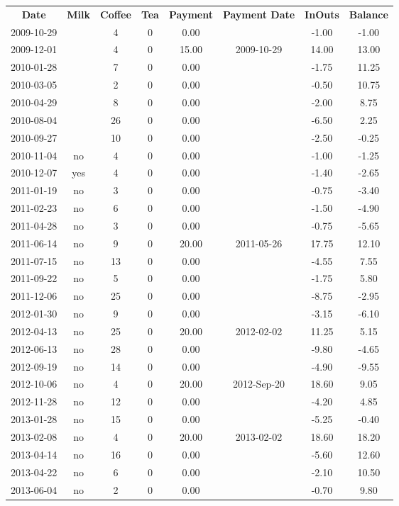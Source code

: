 \begin{center}
\begin{tabular}{cccccccc}
\textbf{Date} & \textbf{Milk} & \textbf{Coffee} & \textbf{Tea} & \textbf{Payment} & \textbf{Payment Date} & \textbf{InOuts} & \textbf{Balance} \\
2009-10-29 &  &  4 & 0 &  0.00 &  & -1.00 & -1.00\\ 
2009-12-01 &  &  4 & 0 & 15.00 & 2009-10-29 & 14.00 & 13.00\\ 
2010-01-28 &  &  7 & 0 &  0.00 &  & -1.75 & 11.25\\ 
2010-03-05 &  &  2 & 0 &  0.00 &  & -0.50 & 10.75\\ 
2010-04-29 &  &  8 & 0 &  0.00 &  & -2.00 &  8.75\\ 
2010-08-04 &  & 26 & 0 &  0.00 &  & -6.50 &  2.25\\ 
2010-09-27 &  & 10 & 0 &  0.00 &  & -2.50 & -0.25\\ 
2010-11-04 & no &  4 & 0 &  0.00 &  & -1.00 & -1.25\\ 
2010-12-07 & yes &  4 & 0 &  0.00 &  & -1.40 & -2.65\\ 
2011-01-19 & no &  3 & 0 &  0.00 &  & -0.75 & -3.40\\ 
2011-02-23 & no &  6 & 0 &  0.00 &  & -1.50 & -4.90\\ 
2011-04-28 & no &  3 & 0 &  0.00 &  & -0.75 & -5.65\\ 
2011-06-14 & no &  9 & 0 & 20.00 & 2011-05-26 & 17.75 & 12.10\\ 
2011-07-15 & no & 13 & 0 &  0.00 &  & -4.55 &  7.55\\ 
2011-09-22 & no &  5 & 0 &  0.00 &  & -1.75 &  5.80\\ 
2011-12-06 & no & 25 & 0 &  0.00 &  & -8.75 & -2.95\\ 
2012-01-30 & no &  9 & 0 &  0.00 &  & -3.15 & -6.10\\ 
2012-04-13 & no & 25 & 0 & 20.00 & 2012-02-02 & 11.25 &  5.15\\ 
2012-06-13 & no & 28 & 0 &  0.00 &  & -9.80 & -4.65\\ 
2012-09-19 & no & 14 & 0 &  0.00 &  & -4.90 & -9.55\\ 
2012-10-06 & no &  4 & 0 & 20.00 & 2012-Sep-20 & 18.60 &  9.05\\ 
2012-11-28 & no & 12 & 0 &  0.00 &  & -4.20 &  4.85\\ 
2013-01-28 & no & 15 & 0 &  0.00 &  & -5.25 & -0.40\\ 
2013-02-08 & no &  4 & 0 & 20.00 & 2013-02-02 & 18.60 & 18.20\\ 
2013-04-14 & no & 16 & 0 &  0.00 &  & -5.60 & 12.60\\ 
2013-04-22 & no &  6 & 0 &  0.00 &  & -2.10 & 10.50\\ 
2013-06-04 & no &  2 & 0 &  0.00 &  & -0.70 &  9.80
\end{tabular}
\end{center}

